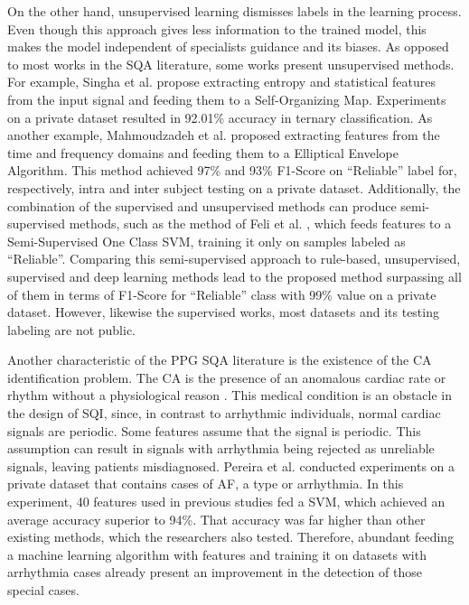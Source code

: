 On the other hand, unsupervised learning dismisses labels in the learning process. Even though this approach gives less information to the trained model, this makes the model independent of specialists guidance and its biases. As opposed to most works in the \gls{SQA} literature, some works present unsupervised methods. For example, Singha et al. \cite{ppg-sqa-4} propose extracting entropy and statistical features from the input signal and feeding them to a Self-Organizing Map. Experiments on a private dataset resulted in 92.01\% accuracy in ternary classification. As another example, Mahmoudzadeh et al. \cite{ppg-sqa-5} proposed extracting features from the time and frequency domains and feeding them to a Elliptical Envelope Algorithm. This method achieved 97\% and 93\% F1-Score on ``Reliable'' label for, respectively, intra and inter subject testing on a private dataset. Additionally, the combination of the supervised and unsupervised methods can produce semi-supervised methods, such as the method of Feli et al. \cite{ppg-sqa-6}, which feeds features to a Semi-Supervised One Class \gls{SVM}, training it only on samples labeled as ``Reliable''. Comparing this semi-supervised approach to rule-based, unsupervised, supervised and deep learning methods lead to the proposed method surpassing all of them in terms of F1-Score for ``Reliable'' class with 99\% value on a private dataset. However, likewise the supervised works, most datasets and its testing labeling are not public.		

Another characteristic of the \gls{PPG} \gls{SQA} literature is the existence of the \gls{CA} identification problem. The \gls{CA} is the presence of an anomalous cardiac rate or rhythm without a physiological reason \cite{arrhythmia-1}. This medical condition is an obstacle in the design of \gls{SQI}, since, in contrast to arrhythmic individuals, normal cardiac signals are periodic. Some features assume that the signal is periodic. This assumption can result in signals with arrhythmia being rejected as unreliable signals, leaving patients  misdiagnosed. Pereira et al. \cite{arrhythmia-2} conducted experiments on a private dataset that contains cases of \gls{AF}, a type or arrhythmia. In this experiment, 40 features used in previous studies fed a \gls{SVM}, which achieved an average accuracy superior to 94\%. That accuracy was far higher than other existing methods, which the researchers also tested. Therefore, abundant feeding a machine learning algorithm with features and training it on datasets with arrhythmia cases already present an improvement in the detection of those special cases.

